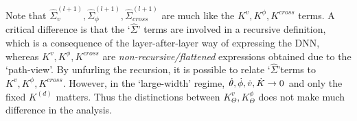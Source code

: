  Note that $\hat{\Sigma}^{(l+1)}_v, \hat{\Sigma}^{(l+1)}_{\phi}, \hat{\Sigma}^{(l+1)}_{cross}$ are much like the $K^v, K^{\phi}, K^{cross}$ terms. A critical difference is that the `$\hat{\Sigma}$' terms are involved in a recursive definition, which is a consequence of the layer-after-layer way of expressing the DNN, whereas $K^v, K^{\phi}, K^{cross}$ are \emph{non-recursive/flattened} expressions obtained due to the `path-view'. By unfurling the recursion, it is possible to relate `$\hat{\Sigma}$'terms to $K^v, K^{\phi}, K^{cross}$. However, in the `large-width' regime, $\dot{\theta},\dot{\phi},\dot{v},\dot{K}\rightarrow 0$ and only the fixed $K^{(d)}$ matters. Thus the distinctions between $K^{v}_{\Theta}, K^{\phi}_{\Theta}$ does not make much difference in the analysis.

